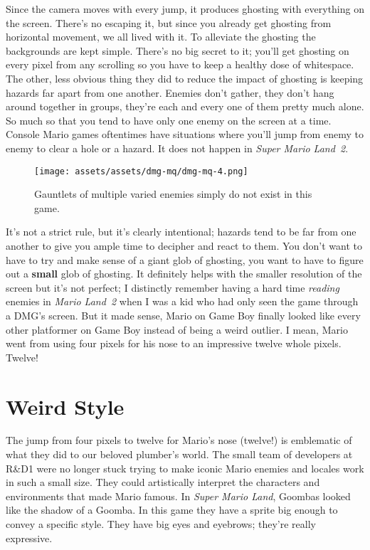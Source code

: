 \documentclass{book}
\begin{document}
Since the camera moves with every jump, it produces ghosting with everything on the screen. There’s no escaping it, but since you already get ghosting from horizontal movement, we all lived with it. To alleviate the ghosting the backgrounds are kept simple. There’s no big secret to it; you’ll get ghosting on every pixel from any scrolling so you have to keep a healthy dose of whitespace. The other, less obvious thing they did to reduce the impact of ghosting is keeping hazards far apart from one another. Enemies don’t gather, they don’t hang around together in groups, they’re each and every one of them pretty much alone. So much so that you tend to have only one enemy on the screen at a time. Console Mario games oftentimes have situations where you’ll jump from enemy to enemy to clear a hole or a hazard. It does not happen in \emph{Super Mario Land 2}.

\begin{figure}[hbt]
\vskip 10pt
\centering \texttt{[image: assets/assets/dmg-mq/dmg-mq-4.png]}\par\pagetwodescription Gauntlets of multiple varied enemies simply do not exist in this game.
\vskip 6pt
\end{figure}

It’s not a strict rule, but it’s clearly intentional; hazards tend to be far from one another to give you ample time to decipher and react to them. You don’t want to have to try and make sense of a giant glob of ghosting, you want to have to figure out a \textbf{small} glob of ghosting. It definitely helps with the smaller resolution of the screen but it’s not perfect; I distinctly remember having a hard time \emph{reading} enemies in \emph{Mario Land 2} when I was a kid who had only seen the game through a DMG’s screen. But it made sense, Mario on Game Boy finally looked like every other platformer on Game Boy instead of being a weird outlier. I mean, Mario went from using four pixels for his nose to an impressive twelve whole pixels. Twelve!

\FloatBarrier\needspace{5pt}\section*{Weird Style}\nopagebreak[4]

The jump from four pixels to twelve for Mario’s nose (twelve!) is emblematic of what they did to our beloved plumber’s world. The small team of developers at R\&D1 were no longer stuck trying to make iconic Mario enemies and locales work in such a small size. They could artistically interpret the characters and environments that made Mario famous. In \emph{Super Mario Land}, Goombas looked like the shadow of a Goomba. In this game they have a sprite big enough to convey a specific style. They have big eyes and eyebrows; they’re really expressive.
\end{document}
